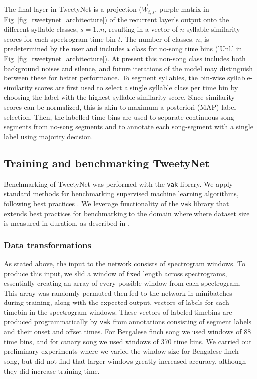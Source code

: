 \documentclass[10pt,letterpaper]{article}
\begin{document}
The final layer in TweetyNet is a projection ($\overrightarrow{W}_{t,s}$, purple matrix in Fig~\ref{fig_tweetynet_architecture}) of the recurrent layer's output onto the different syllable classes, $s=1..n$, resulting in a vector of $n$ syllable-similarity scores for each spectrogram time bin $t$. The number of classes, $n$, is predetermined by the user and includes a class for no-song time bins ('Unl.' in Fig~\ref{fig_tweetynet_architecture}). At present this non-song class includes both background noises and silence, and future iterations of the model may distinguish between these for better performance. To segment syllables, the bin-wise syllable-similarity scores are first used to select a single syllable class per time bin by choosing the label with the highest syllable-similarity score. Since similarity scores can be normalized, this is akin to maximum a-posteriori (MAP) label selection. Then, the labelled time bins are used to separate continuous song segments from no-song segments and to annotate each song-segment with a single label using majority decision.  

\subsection*{Training and benchmarking TweetyNet}
\label{methods:training}
Benchmarking of TweetyNet was performed with the \texttt{vak} library.
We apply standard methods for benchmarking supervised machine learning algorithms, following best practices \cite{james2013introduction}.
We leverage functionality of the \texttt{vak} library 
that extends best practices for benchmarking to the domain where 
where dataset size is measured in duration, as described in .

\subsubsection*{Data transformations}
As stated above, the input to the network consists of spectrogram windows. To produce this input, 
we slid a window of fixed length across spectrograms, essentially creating an array of every possible 
window from each spectrogram. This array was randomly permuted then fed to the network in minibatches 
during training, along with the expected output, vectors of labels for each timebin in the 
spectrogram windows. These vectors of labeled timebins are produced programmatically by \texttt{vak} 
from annotations consisting of segment labels and their onset and offset times.
For Bengalese finch song we used windows of 88 time bins, 
and for canary song we used windows of 370 time bins.
We carried out preliminary experiments where we varied the window size 
for Bengalese finch song, but did not find that larger windows 
greatly increased accuracy, although they did increase training time.
\end{document}
